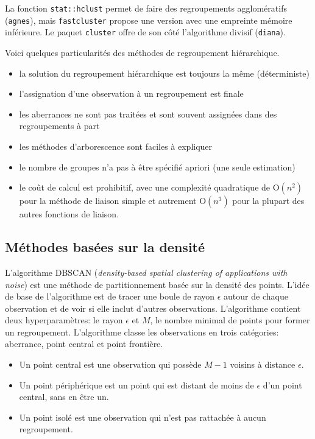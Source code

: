 \documentclass[
  11pt,
  letterpaper,
]{scrbook}
\providecommand{\tightlist}{%
  \setlength{\itemsep}{0pt}\setlength{\parskip}{0pt}}\usepackage{longtable,booktabs,array}
\theoremstyle{definition}
\theoremstyle{remark}
\begin{document}
La fonction \texttt{stat::hclust} permet de faire des regroupements
agglomératifs (\texttt{agnes}), mais \texttt{fastcluster} propose une
version avec une empreinte mémoire inférieure. Le paquet
\texttt{cluster} offre de son côté l'algorithme divisif
(\texttt{diana}).

Voici quelques particularités des méthodes de regroupement hiérarchique.

\begin{itemize}
\tightlist
\item
  la solution du regroupement hiérarchique est toujours la même
  (déterministe)
\item
  l'assignation d'une observation à un regroupement est finale
\item
  les aberrances ne sont pas traitées et sont souvent assignées dans des
  regroupements à part
\item
  les méthodes d'arborescence sont faciles à expliquer
\item
  le nombre de groupes n'a pas à être spécifié apriori (une seule
  estimation)
\item
  le coût de calcul est prohibitif, avec une complexité quadratique de
  \(\mathrm{O}(n^2)\) pour la méthode de liaison simple et autrement
  \(\mathrm{O}(n^3)\) pour la plupart des autres fonctions de liaison.
\end{itemize}

\hypertarget{muxe9thodes-basuxe9es-sur-la-densituxe9}{%
\subsection{Méthodes basées sur la
densité}\label{muxe9thodes-basuxe9es-sur-la-densituxe9}}

L'algorithme DBSCAN (\emph{density-based spatial clustering of
applications with noise}) est une méthode de partitionnement basée sur
la densité des points. L'idée de base de l'algorithme est de tracer une
boule de rayon \(\epsilon\) autour de chaque observation et de voir si
elle inclut d'autres observations. L'algorithme contient deux
hyperparamètres: le rayon \(\epsilon\) et \(M\), le nombre minimal de
points pour former un regroupement. L'algorithme classe les observations
en trois catégories: aberrance, point central et point frontière.

\begin{itemize}
\tightlist
\item
  Un point central est une observation qui possède \(M-1\) voisins à
  distance \(\epsilon\).
\item
  Un point périphérique est un point qui est distant de moins de
  \(\epsilon\) d'un point central, sans en être un.
\item
  Un point isolé est une observation qui n'est pas rattachée à aucun
  regroupement.
\end{itemize}
\end{document}
